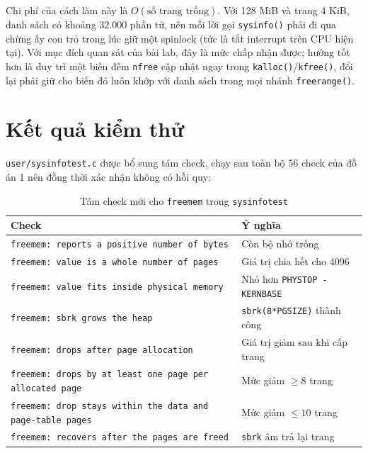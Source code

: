 Chi phí của cách làm này là $O(\text{số trang trống})$. Với 128 MiB và trang 4 KiB, danh sách có khoảng 32.000 phần tử, nên mỗi lời gọi \texttt{sysinfo()} phải đi qua chừng ấy con trỏ trong lúc giữ một spinlock (tức là tắt interrupt trên CPU hiện tại). Với mục đích quan sát của bài lab, đây là mức chấp nhận được; hướng tốt hơn là duy trì một biến đếm \texttt{nfree} cập nhật ngay trong \texttt{kalloc()}/\texttt{kfree()}, đổi lại phải giữ cho biến đó luôn khớp với danh sách trong mọi nhánh \texttt{freerange()}.

\section{Kết quả kiểm thử}

\texttt{user/sysinfotest.c} được bổ sung tám check, chạy sau toàn bộ 56 check của đồ án 1 nên đồng thời xác nhận không có hồi quy:

\begin{table}[H]
    \centering
    \renewcommand{\arraystretch}{1.3}
    \setlength{\tabcolsep}{8pt}
    \begin{tabular}{|p{7.5cm}|p{6.5cm}|}
        \hline
        \rowcolor[rgb]{0.8, 0.9, 1.0}
        \textbf{Check} & \textbf{Ý nghĩa} \\ \hline
        \texttt{freemem: reports a positive number of bytes} & Còn bộ nhớ trống \\ \hline
        \texttt{freemem: value is a whole number of pages} & Giá trị chia hết cho 4096 \\ \hline
        \texttt{freemem: value fits inside physical memory} & Nhỏ hơn \texttt{PHYSTOP - KERNBASE} \\ \hline
        \texttt{freemem: sbrk grows the heap} & \texttt{sbrk(8*PGSIZE)} thành công \\ \hline
        \texttt{freemem: drops after page allocation} & Giá trị giảm sau khi cấp trang \\ \hline
        \texttt{freemem: drops by at least one page per allocated page} & Mức giảm $\ge 8$ trang \\ \hline
        \texttt{freemem: drop stays within the data and page-table pages} & Mức giảm $\le 10$ trang \\ \hline
        \texttt{freemem: recovers after the pages are freed} & \texttt{sbrk} âm trả lại trang \\ \hline
    \end{tabular}
    \caption{Tám check mới cho \texttt{freemem} trong \texttt{sysinfotest}}
\end{table}

